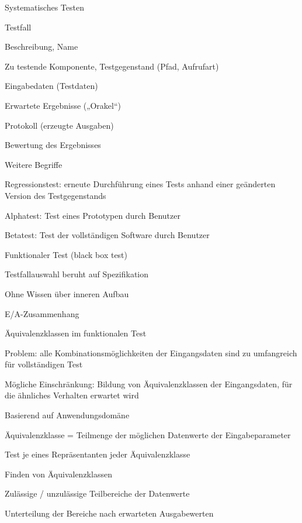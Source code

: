 \documentclass[a4paper]{article}
\begin{document}
\begin{multicols}{3}
  Systematisches Testen
  \begin{itemize*}
    \item Testfall
    \begin{itemize*}
      \item Beschreibung, Name
      \item Zu testende Komponente, Testgegenstand (Pfad, Aufrufart)
      \item Eingabedaten (Testdaten)
      \item Erwartete Ergebnisse („Orakel“)
      \item Protokoll (erzeugte Ausgaben)
      \item Bewertung des Ergebnisses
    \end{itemize*}
    \item Weitere Begriffe
    \begin{itemize*}
      \item Regressionstest: erneute Durchführung eines Tests anhand einer geänderten Version des Testgegenstands
      \item Alphatest: Test eines Prototypen durch Benutzer
      \item Betatest: Test der vollständigen Software durch Benutzer
    \end{itemize*}
  \end{itemize*}

  Funktionaler Test (black box test)
  \begin{itemize*}
    \item Testfallauswahl beruht auf Spezifikation
    \item Ohne Wissen über inneren Aufbau
    \item E/A-Zusammenhang
  \end{itemize*}

  Äquivalenzklassen im funktionalen Test
  \begin{itemize*}
    \item Problem: alle Kombinationsmöglichkeiten der Eingangsdaten sind zu umfangreich für vollständigen Test
    \item Mögliche Einschränkung: Bildung von Äquivalenzklassen der Eingangsdaten, für die ähnliches Verhalten erwartet wird
    \item Basierend auf Anwendungsdomäne
    \item Äquivalenzklasse = Teilmenge der möglichen Datenwerte der Eingabeparameter
    \item Test je eines Repräsentanten jeder Äquivalenzklasse
    \item Finden von Äquivalenzklassen
    \begin{itemize*}
      \item Zulässige / unzulässige Teilbereiche der Datenwerte
      \item Unterteilung der Bereiche nach erwarteten Ausgabewerten
    \end{itemize*}
  \end{itemize*}


\end{multicols}
\end{document}
